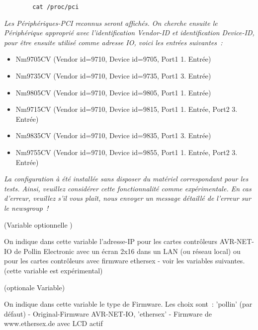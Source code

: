 \begin{description}
\begin{example}
\begin{verbatim}
        cat /proc/pci
\end{verbatim}
\end{example}

        \emph{Les Périphériques-PCI reconnus seront affichés. On cherche ensuite le
        Périphérique approprié avec l'identification Vendor-ID et identification
        Device-ID, pour être ensuite utilisé comme adresse IO, voici les entrées
        suivantes~:}

        \begin{itemize}
        \item Nm9705CV  (Vendor id=9710, Device id=9705, Port1 1. Entrée)
        \item Nm9735CV  (Vendor id=9710, Device id=9735, Port1 3. Entrée)
        \item Nm9805CV  (Vendor id=9710, Device id=9805, Port1 1. Entrée)
        \item Nm9715CV  (Vendor id=9710, Device id=9815, Port1 1. Entrée, Port2 3. Entrée)
        \item Nm9835CV  (Vendor id=9710, Device id=9835, Port1 3. Entrée)
        \item Nm9755CV  (Vendor id=9710, Device id=9855, Port1 1. Entrée, Port2 3. Entrée)
        \end{itemize}

        \emph{La configuration à été installée sans disposer du matériel correspondant
        pour les tests. Ainsi, veuillez considérer cette fonctionnalité comme
        expérimentale. En cas d'erreur, veuillez s'il vous plaît, nous envoyer
        un message détaillé de l'erreur sur le newsgroup~!}

 (Variable optionnelle )

      On indique dans cette variable l'adresse-IP pour les cartes contrôleurs AVR-NET-IO
      de Pollin Electronic avec un écran 2x16 dans un LAN (ou réseau local) ou
      pour les cartes contrôleurs avec firmware ethersex - voir les variables
      suivantes. (cette variable est expérimental)

 (optionale Variable)

      On indique dans cette variable le type de Firmware.
      Les choix sont~: 'pollin' (par défaut) - Original-Firmware AVR-NET-IO,
      'ethersex' - Firmware de www.ethersex.de avec LCD actif


\end{description}
